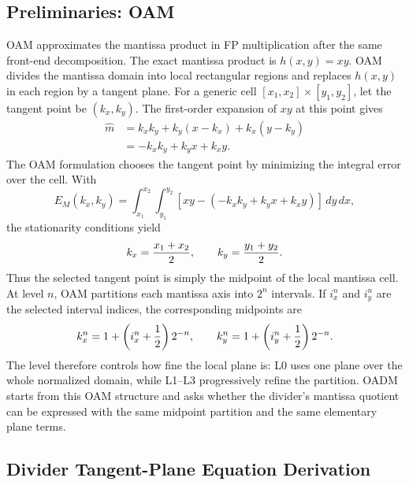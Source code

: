 \documentclass[conference]{IEEEtran}
\begin{document}
\subsection{Preliminaries: OAM}
OAM approximates the mantissa product in FP multiplication after the same
front-end decomposition. The exact mantissa product is $h(x,y)=xy$. OAM divides
the mantissa domain into local
rectangular regions and replaces $h(x,y)$ in each region by a tangent plane.
For a generic cell $[x_1,x_2]\times[y_1,y_2]$, let the tangent point be
$(k_x,k_y)$. The first-order expansion of $xy$ at this point gives
\begin{equation}
\begin{aligned}
\widehat{m}
&= k_xk_y+k_y(x-k_x)+k_x(y-k_y) \\
&= -k_xk_y+k_yx+k_xy .
\end{aligned}
\label{eq:oam_plane_prelim}
\end{equation}
The OAM formulation chooses the tangent point by minimizing the integral error
over the cell. With
\begin{equation}
E_M(k_x,k_y)=\int_{x_1}^{x_2}\int_{y_1}^{y_2}
\left[xy-(-k_xk_y+k_yx+k_xy)\right]\,dy\,dx,
\end{equation}
the stationarity conditions yield
\begin{equation}
k_x={x_1+x_2\over2},\qquad k_y={y_1+y_2\over2}.
\label{eq:oam_midpoint_prelim}
\end{equation}
Thus the selected tangent point is simply the midpoint of the local mantissa
cell. At level $n$, OAM partitions each mantissa axis into $2^n$ intervals. If
$i_x^n$ and $i_y^n$ are the selected interval indices, the corresponding
midpoints are
\begin{equation}
k_x^n=1+\left(i_x^n+{1\over2}\right)2^{-n},\qquad
k_y^n=1+\left(i_y^n+{1\over2}\right)2^{-n}.
\end{equation}
The level therefore controls how fine the local plane is: L0 uses one plane
over the whole normalized domain, while L1--L3 progressively refine the
partition. OADM starts from this OAM structure and asks whether the divider's
mantissa quotient can be expressed with the same midpoint partition and the
same elementary plane terms.

\subsection{Divider Tangent-Plane Equation Derivation}
\end{document}
